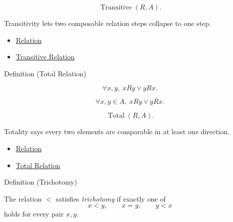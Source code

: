 \begin{remark*}
\[
\operatorname{Transitive}(R,A).
\]
\end{remark*}

\begin{remark*}[Interpretation]
Transitivity lets two composable relation steps collapse to one step.
\end{remark*}

\begin{dependencies}
\begin{itemize}
  \item \hyperref[def:relation]{Relation}
  \item \hyperref[def:transitive]{Transitive Relation}
\end{itemize}
\end{dependencies}

\begin{definitionbox}{Definition (Total Relation)}
\begin{definition}
\label{def:total-relation}
\[
\forall x,y,\ xRy\lor yRx.
\]
\end{definition}
\end{definitionbox}

\begin{remark*}
\[
\forall x,y\in A,\ xRy\lor yRx.
\]
\end{remark*}

\begin{remark*}
\[
\operatorname{Total}(R,A).
\]
\end{remark*}

\begin{remark*}[Interpretation]
Totality says every two elements are comparable in at least one direction.
\end{remark*}

\begin{dependencies}
\begin{itemize}
  \item \hyperref[def:relation]{Relation}
  \item \hyperref[def:total-rel]{Total Relation}
\end{itemize}
\end{dependencies}

\begin{definitionbox}{Definition (Trichotomy)}
\begin{definition}[Trichotomy]
\label{def:trichotomy}
The relation $<$ satisfies \emph{trichotomy} if exactly one of
\[
x<y,\qquad x=y,\qquad y<x
\]
holds for every pair $x,y$.
\end{definition}
\end{definitionbox}

